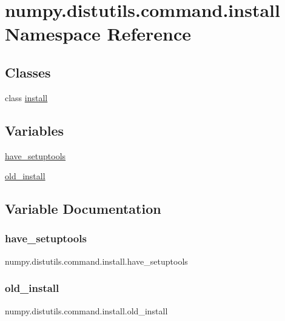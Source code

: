 \hypertarget{namespacenumpy_1_1distutils_1_1command_1_1install}{}\section{numpy.\+distutils.\+command.\+install Namespace Reference}
\label{namespacenumpy_1_1distutils_1_1command_1_1install}
\subsection*{Classes}
\begin{DoxyCompactItemize}
\item 
class \hyperlink{classnumpy_1_1distutils_1_1command_1_1install_1_1install}{install}
\end{DoxyCompactItemize}
\subsection*{Variables}
\begin{DoxyCompactItemize}
\item 
\hyperlink{namespacenumpy_1_1distutils_1_1command_1_1install_a7c7967f1b8dad25f547578eb4bdbedf0}{have\+\_\+setuptools}
\item 
\hyperlink{namespacenumpy_1_1distutils_1_1command_1_1install_a3c34b9da8f88589b95c1306fb346aaa1}{old\+\_\+install}
\end{DoxyCompactItemize}


\subsection{Variable Documentation}
\mbox{\label{namespacenumpy_1_1distutils_1_1command_1_1install_a7c7967f1b8dad25f547578eb4bdbedf0}} 
\subsubsection{\texorpdfstring{have\+\_\+setuptools}{have\_setuptools}}
{\footnotesize\ttfamily numpy.\+distutils.\+command.\+install.\+have\+\_\+setuptools}

\mbox{\label{namespacenumpy_1_1distutils_1_1command_1_1install_a3c34b9da8f88589b95c1306fb346aaa1}} 
\subsubsection{\texorpdfstring{old\+\_\+install}{old\_install}}
{\footnotesize\ttfamily numpy.\+distutils.\+command.\+install.\+old\+\_\+install}

